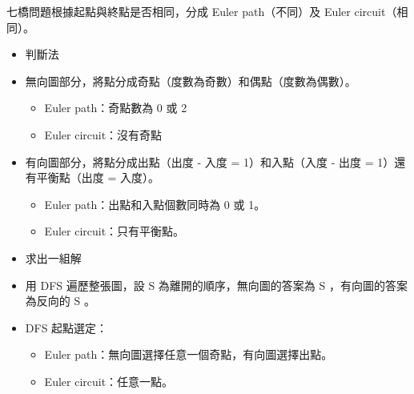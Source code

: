 七橋問題根據起點與終點是否相同，分成 Euler path（不同）及 Euler circuit（相同）。

\begin{itemize}
    \item 判斷法
    \item 無向圖部分，將點分成奇點（度數為奇數）和偶點（度數為偶數）。
    \begin{itemize}
        \item Euler path：奇點數為 0 或 2
        \item Euler circuit：沒有奇點
    \end{itemize}
    \item 有向圖部分，將點分成出點（出度 - 入度 = 1）和入點（入度 - 出度 = 1）還有平衡點（出度 = 入度）。
    \begin{itemize}
        \item Euler path：出點和入點個數同時為 0 或 1。
        \item Euler circuit：只有平衡點。
    \end{itemize}
    \item 求出一組解
    \item 用 DFS 遍歷整張圖，設 S 為離開的順序，無向圖的答案為 S ，有向圖的答案為反向的 S 。
    \item DFS 起點選定：
    \begin{itemize}
        \item Euler path：無向圖選擇任意一個奇點，有向圖選擇出點。
        \item Euler circuit：任意一點。
    \end{itemize}
\end{itemize}

